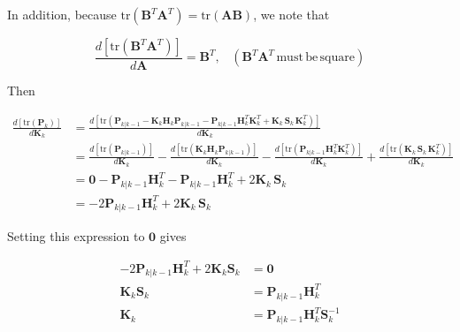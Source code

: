 In addition, because $\mathrm{tr}\left(\mathbf{B}^T \mathbf{A}^T\right) = \mathrm{tr}\left(\mathbf{A} \mathbf{B}\right)$,
we note that

\begin{equation*}
    \frac {d \left[ \mathrm{tr} \left( \mathbf{B}^T \mathbf{A}^T \right) \right]} {d \mathbf{A}} = \mathbf{B}^T , \phantom{X} (\mathbf{B}^T \mathbf{A}^T \, \mathrm{must} \, \mathrm{be} \, \mathrm{square})
\end{equation*}

Then

\begin{equation*}
    \begin{aligned}
        \frac {d \left[ \mathrm{tr}(\mathbf{P}_k) \right]} {d \mathbf{K}_k}
        &= \frac {d \left[ \mathrm{tr} \left(
        \mathbf{P}_{k|k-1} - \mathbf{K}_k \mathbf{H}_k \mathbf{P}_{k|k-1} - \mathbf{P}_{k|k-1} \mathbf{H}_k^T \mathbf{K}_k^T
        + \mathbf{K}_k \, \mathbf{S}_k \, \mathbf{K}_k^T
        \right) \right]} {d \mathbf{K}_k} \\
        &= \frac {d \left[ \mathrm{tr} \left( \mathbf{P}_{k|k-1} \right) \right] } {d \mathbf{K}_k}
         - \frac {d \left[ \mathrm{tr} \left( \mathbf{K}_k \mathbf{H}_k \mathbf{P}_{k|k-1} \right) \right] } {d \mathbf{K}_k}
         - \frac {d \left[ \mathrm{tr} \left( \mathbf{P}_{k|k-1} \mathbf{H}_k^T \mathbf{K}_k^T \right) \right] } {d \mathbf{K}_k}
         + \frac {d \left[ \mathrm{tr} \left( \mathbf{K}_k \, \mathbf{S}_k \, \mathbf{K}_k^T \right) \right] } {d \mathbf{K}_k} \\
        &= \mathbf{0} - \mathbf{P}_{k|k-1} \mathbf{H}_k^T - \mathbf{P}_{k|k-1} \mathbf{H}_k^T + 2 \mathbf{K}_k \, \mathbf{S}_k \\
        &= - 2 \mathbf{P}_{k|k-1} \mathbf{H}_k^T + 2 \mathbf{K}_k \, \mathbf{S}_k
    \end{aligned}
\end{equation*}

Setting this expression to $\mathbf{0}$ gives

\begin{equation*}
    \begin{aligned}
        - 2 \mathbf{P}_{k|k-1} \mathbf{H}_k^T + 2 \mathbf{K}_k \mathbf{S}_k &= \mathbf{0} \\
        \mathbf{K}_k \mathbf{S}_k &= \mathbf{P}_{k|k-1} \mathbf{H}_k^T \\
        \mathbf{K}_k &= \mathbf{P}_{k|k-1} \mathbf{H}_k^T \mathbf{S}_k^{-1}
    \end{aligned}
\end{equation*}

